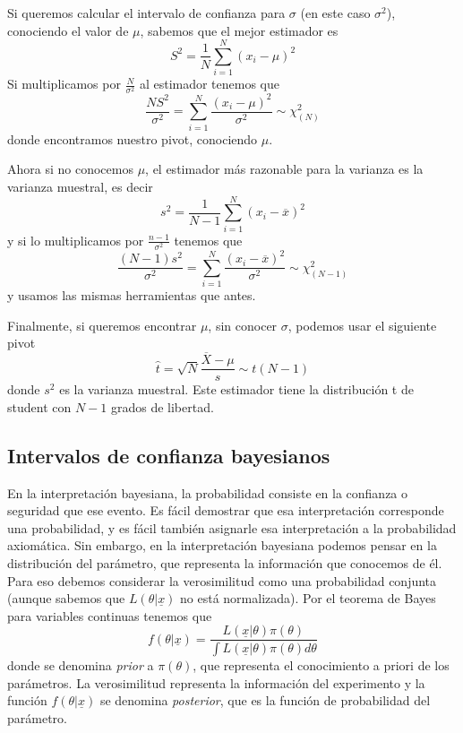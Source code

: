 \documentclass{article}
\numberwithin{equation}{section} %
\begin{document}
Si queremos calcular el intervalo de confianza para $\sigma$ (en este caso $\sigma^2$), conociendo el valor de $\mu$, sabemos que el mejor estimador es
\begin{equation}
S^2 = \frac{1}{N} \sum_{i=1}^{N} (x_i - \mu)^2
\end{equation}
Si multiplicamos por $\frac{N}{\sigma^{2}}$ al estimador tenemos que
\begin{equation}
\frac{N S^2}{\sigma^2} = \sum_{i=1}^{N} \frac{(x_i - \mu)^2}{\sigma^2} \sim \chi^{2}_{(N)}
\end{equation}
donde encontramos nuestro pivot, conociendo $\mu$.

Ahora si no conocemos $\mu$, el estimador más razonable para la varianza es la varianza muestral, es decir
\begin{equation}
s^2 = \frac{1}{N - 1} \sum_{i = 1}^{N} (x_i - \overline{x})^2
\end{equation}
y si lo multiplicamos por $\frac{n - 1}{\sigma^2}$ tenemos que
\begin{equation}
\frac{(N - 1) s^2}{\sigma^2} = \sum_{i = 1}^{N} \frac{(x_i - \overline{x})^2}{\sigma^2} \sim \chi^2_{(N-1)}
\end{equation}
y usamos las mismas herramientas que antes.

Finalmente, si queremos encontrar $\mu$, sin conocer $\sigma$, podemos usar el siguiente pivot
\begin{equation}
\hat{t} = \sqrt{N}\frac{\overline{X} - \mu}{s} \sim t(N - 1)
\end{equation}
donde $s^2$ es la varianza muestral. Este estimador tiene la distribución t de student con $N - 1$ grados de libertad.

\subsection{Intervalos de confianza bayesianos}
En la interpretación bayesiana, la probabilidad consiste en la confianza o seguridad que ese evento. Es fácil demostrar que esa interpretación corresponde una probabilidad, y es fácil también asignarle esa interpretación a la probabilidad axiomática. 
Sin embargo, en la interpretación bayesiana podemos pensar en la distribución del parámetro, que representa la información que conocemos de él. Para eso debemos considerar la verosimilitud como una probabilidad conjunta (aunque sabemos que $L(\theta|\underline{x})$ no está normalizada). Por el teorema de Bayes para variables continuas tenemos que
\begin{equation}
f(\theta|\underline{x}) = \frac{L(\underline{x}|\theta) \pi(\theta)}{\int L(\underline{x}|\theta) \pi(\theta) d\theta}
\end{equation}
donde se denomina \emph{prior} a $\pi(\theta)$, que representa el conocimiento a priori de los parámetros. La verosimilitud representa la información del experimento y la función $f(\theta|\underline{x})$ se denomina \emph{posterior}, que es la función de probabilidad del parámetro. 
\end{document}

